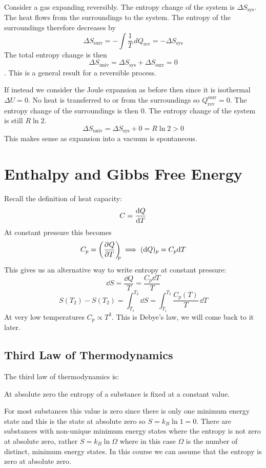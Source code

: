 \documentclass{article}
\begin{document}
    Consider a gas expanding reversibly.
    The entropy change of the system is \(\Delta S_\text{sys}\).
    The heat flows from the surroundings to the system.
    The entropy of the surroundings therefore decreases by
    \[\Delta S_\text{surr} = -\int\frac{1}{T}\,dQ_\text{rev} = -\Delta S_\text{sys}\]
    The total entropy change is then
    \[\Delta S_\text{univ} = \Delta S_\text{sys} + \Delta S_\text{surr} = 0\].
    This is a general result for a reversible process.
    
    If instead we consider the Joule expansion as before then since it is isothermal \(\Delta U = 0\).
    No heat is transferred to or from the surroundings so \(Q_\text{rev}^\text{surr} = 0\).
    The entropy change of the surroundings is then 0.
    The entropy change of the system is still \(R\ln 2\).
    \[\Delta S_\text{univ} = \Delta S_\text{sys} + 0 = R\ln 2 > 0\]
    This makes sense as expansion into a vacuum is spontaneous.
    
    \section{Enthalpy and Gibbs Free Energy}
    Recall the definition of heat capacity:
    \[C = \dv{Q}{T}\]
    At constant pressure this becomes
    \[C_p = \left(\pdv[]{Q}{T}\right)_{\!\!\!{p}}\implies (\dd Q)_p = C_p\dd T\]
    This gives us an alternative way to write entropy at constant pressure:
    \[\dd S = \frac{\dd Q}{T} = \frac{C_p\dd T}{T}\]
    \[S(T_2) - S(T_2) = \int_{T_1}^{T_2}\dd S = \int_{T_1}^{T_2}\frac{C_p(T)}{T}\,\dd T\]
    At very low temperatures \(C_p \propto T^3\).
    This is Debye's law, we will come back to it later.
    
    \subsection{Third Law of Thermodynamics}
    The third law of thermodynamics is:
    \begin{displayquote}
        At absolute zero the entropy of a substance is fixed at a constant value.
    \end{displayquote}
    For most substances this value is zero since there is only one minimum energy state and this is the state at absolute zero so \(S = k_B\ln 1 = 0\).
    There are substances with non-unique minimum energy states where the entropy is not zero at absolute zero, rather \(S = k_B\ln\Omega\) where in this case \(\Omega\) is the number of distinct, minimum energy states.
    In this course we can assume that the entropy is zero at absolute zero.
    
\end{document}
